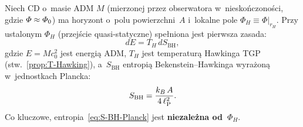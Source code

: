 \begin{theorem}\label{thm:first-law-TGP}
Niech CD o~masie ADM $M$ (mierzonej przez obserwatora
w~niesko\'nczono\'sci, gdzie $\varPhi \approx \varPhi_0$) ma
horyzont o~polu powierzchni~$A$ i~lokalne pole
$\Phi_H \equiv \Phi\big|_{r_H}$.
Przy ustalonym $\Phi_H$ (przej\'scie quasi-statyczne)
spe\l{}niona jest pierwsza zasada:
\begin{equation}\label{eq:first-law-TGP}
    \boxed{dE = T_H\,dS_{\mathrm{BH}},}
\end{equation}
gdzie $E = Mc_0^2$ jest energi\k{a} ADM,
$T_H$ jest temperatur\k{a} Hawkinga TGP
(stw.~\ref{prop:T-Hawking}), a~$S_{\mathrm{BH}}$ entropi\k{a}
Bekenstein--Hawkinga wyra\.zon\k{a} w~jednostkach Plancka:
\begin{equation}\label{eq:S-BH-Planck}
    S_{\mathrm{BH}} = \frac{k_B\,A}{4\,\ell_{\mathrm{P}}^2}.
\end{equation}
Co kluczowe, entropia~\eqref{eq:S-BH-Planck} jest
\textbf{niezale\.zna od~$\Phi_H$}.
\end{theorem}

